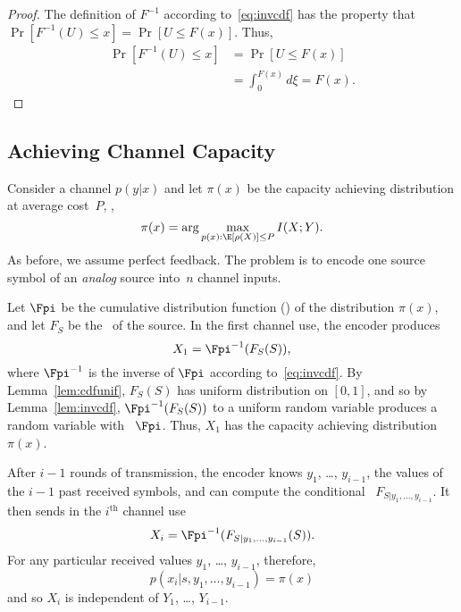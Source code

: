 \begin{proof}
  The definition of $F^{-1}$ according to~\eqref{eq:invcdf} has the property
  that $\Pr[F^{-1}(U) \le x] = \Pr[U \le F(x)]$. Thus,
  \begin{align*}
    \Pr[F^{-1}(U) \le x] &= \Pr[U \le F(x)] \\
    &= \int_0^{F(x)} d\xi = F(x).
  \end{align*}
\end{proof}

\subsection{Achieving Channel Capacity}

Consider a channel $p(y|x)$ and let $\pi(x)$ be the capacity achieving
distribution at average cost~$P$, \ie, 
\begin{equation*}
  \pi(x) = \arg\max_{p(x): \E[\rho(X)] \le P} I(X;Y).
\end{equation*}
As before, we assume perfect feedback. The problem is to encode one source
symbol of an \emph{analog} source into~$n$ channel inputs. 

Let $\Fpi$ be the cumulative distribution function (\cdf) of the distribution
$\pi(x)$, and let $F_S$ be the \cdf\ of the source. In the first channel
use, the encoder produces
\begin{equation}
  \label{eq:posteriorx1}
  X_1 = \Fpi^{-1}(F_S(S)),
\end{equation}
where $\Fpi^{-1}$ is the inverse of $\Fpi$ according to~\eqref{eq:invcdf}. By
Lemma~\ref{lem:cdfunif}, $F_S(S)$ has uniform distribution on $[0,1]$, and so by
Lemma~\ref{lem:invcdf}, $\Fpi^{-1}(F_S(S))$ to a uniform random variable
produces a random variable with \cdf\ $\Fpi$. Thus, $X_1$ has the capacity
achieving distribution~$\pi(x)$. 

After $i-1$ rounds of transmission, the encoder knows $y_1$, \ldots, $y_{i-1}$,
the values of the $i-1$ past received symbols, and can compute the conditional
\cdf\ $F_{S|y_1, \ldots, y_{i-1}}$. It then sends in the $i^{\text{th}}$ channel
use
\begin{equation}
  \label{eq:posteriorxi}
  X_i = \Fpi^{-1}(F_{S|y_1,\dots,y_{i-1}}(S)).
\end{equation}
For any particular received values $y_1$, \ldots, $y_{i-1}$, therefore,
\begin{equation*}
  p(x_i|s, y_1, \dots, y_{i-1}) = \pi(x)
\end{equation*}
and so $X_i$ is independent of $Y_1$, \ldots, $Y_{i-1}$. 


